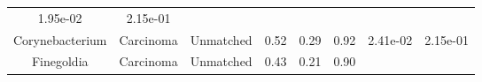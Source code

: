 \documentclass[12pt,]{article}
\begin{document}
\begin{longtable}[]{@{}cccccccc@{}}
\begin{minipage}[t]{0.06\columnwidth}
1.95e-02\strut
\end{minipage} & \begin{minipage}[t]{0.06\columnwidth}\centering\strut
2.15e-01\strut
\end{minipage}\tabularnewline
\begin{minipage}[t]{0.18\columnwidth}\centering\strut
Corynebacterium\strut
\end{minipage} & \begin{minipage}[t]{0.07\columnwidth}\centering\strut
Carcinoma\strut
\end{minipage} & \begin{minipage}[t]{0.09\columnwidth}\centering\strut
Unmatched\strut
\end{minipage} & \begin{minipage}[t]{0.03\columnwidth}\centering\strut
0.52\strut
\end{minipage} & \begin{minipage}[t]{0.14\columnwidth}\centering\strut
0.29\strut
\end{minipage} & \begin{minipage}[t]{0.14\columnwidth}\centering\strut
0.92\strut
\end{minipage} & \begin{minipage}[t]{0.06\columnwidth}\centering\strut
2.41e-02\strut
\end{minipage} & \begin{minipage}[t]{0.06\columnwidth}\centering\strut
2.15e-01\strut
\end{minipage}\tabularnewline
\begin{minipage}[t]{0.18\columnwidth}\centering\strut
Finegoldia\strut
\end{minipage} & \begin{minipage}[t]{0.07\columnwidth}\centering\strut
Carcinoma\strut
\end{minipage} & \begin{minipage}[t]{0.09\columnwidth}\centering\strut
Unmatched\strut
\end{minipage} & \begin{minipage}[t]{0.03\columnwidth}\centering\strut
0.43\strut
\end{minipage} & \begin{minipage}[t]{0.14\columnwidth}\centering\strut
0.21\strut
\end{minipage} & \begin{minipage}[t]{0.14\columnwidth}\centering\strut
0.90\strut
\end{minipage} & \begin{minipage}[t]{0.06\columnwidth}\centering\strut

\end{minipage}
\end{longtable}
\end{document}
